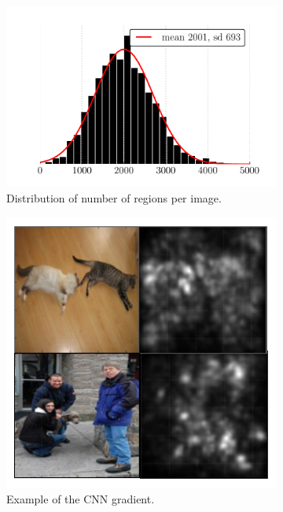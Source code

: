 \begin{figure}
\centering
\begin{subfigure}[b]{0.52\linewidth}
    \includegraphics[width=\linewidth]{figures/roi_hist.pdf}
    \caption{Distribution of number of regions per image.}\label{fig:roi_hist}
\end{subfigure}\hfill
\begin{subfigure}[b]{0.33\linewidth}
    \includegraphics[width=\linewidth]{figures/gradient.pdf}
    \caption{Example of the CNN gradient.}\label{fig:gradient}
\end{subfigure}
\caption{}
\end{figure}
